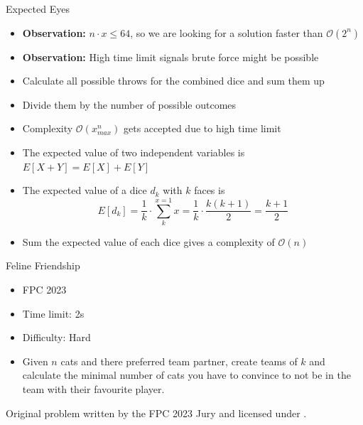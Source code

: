 \documentclass[11pt,pdf, aspectratio=169]{beamer}
\begin{document}
  \begin{frame}{Expected Eyes}
    \begin{itemize}
      \item<1-> \textbf{Observation:} $n\cdot x \leq 64$, so we are looking for a solution faster than $\mathcal{O}(2^n)$
      \item<1-> \textbf{Observation:} High time limit signals brute force might be possible
      \item<2-> Calculate all possible throws for the combined dice and sum them up
      \item<2-> Divide them by the number of possible outcomes
      \item<2-> Complexity $\mathcal{O}(x_{max}^n)$ gets accepted due to high time limit
      \item<3-> The expected value of two independent variables is $E[X+Y] = E[X]+E[Y]$
      \item<4-> The expected value of a dice $d_k$ with $k$ faces is \\
      \[E[d_k] = \frac{1}{k}\cdot \sum_{k}^{x=1} x = \frac{1}{k}\cdot\frac{k(k+1)}{2} = \frac{k+1}{2}\]
      \item<5-> Sum the expected value of each dice gives a complexity of $\mathcal{O}(n)$
    \end{itemize}
  \end{frame}
  \begin{frame}{Feline Friendship}
    \begin{itemize}
      \item FPC 2023
      \item Time limit: 2s
      \item Difficulty: Hard
      \item Given $n$ cats and there preferred team partner, create teams of $k$ and calculate the minimal number of cats you have to convince to not be in the team with their favourite player.
    \end{itemize}
    Original problem written by the FPC 2023 Jury and licensed under \doclicenseLongNameRef.

    \doclicenseImage

  \end{frame}
\end{document}
